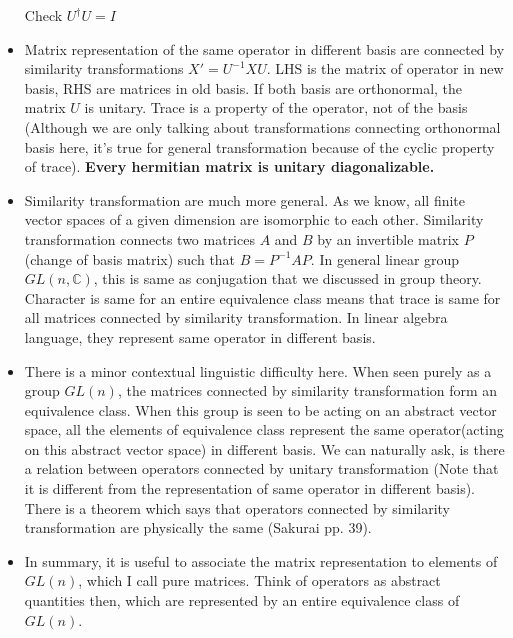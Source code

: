 \documentclass{report}
\begin{document}
\begin{itemize}
  Check $U^\dag U = I$

\item Matrix representation of the same operator in different basis are connected by similarity transformations $X' =U^{-1}XU$. LHS is the matrix of operator in new basis, RHS are matrices in old basis. If both basis are orthonormal, the matrix $U$ is unitary. Trace is a property of the operator, not of the basis (Although we are only talking about transformations connecting orthonormal basis here, it's true for general transformation because of the cyclic property of trace). \textbf{Every hermitian matrix is unitary diagonalizable.}\\

\item Similarity transformation are much more general. As we know, all finite vector spaces of a given dimension are isomorphic to each other. Similarity transformation connects two matrices $A$ and $B$ by an invertible matrix $P$(change of basis matrix) such that $B = P^{-1}AP$. In general linear group $GL(n,\mathbb{C})$, this is same as conjugation that we discussed in group theory. Character is same for an entire equivalence class means that trace is same for all matrices connected by similarity transformation. In linear algebra language, they represent same operator in different basis.\\

\item There is a minor contextual linguistic difficulty here. When seen purely as a group $GL(n)$, the matrices connected by similarity transformation form an equivalence class. When this group is seen to be acting on an abstract vector space, all the elements of equivalence class represent the same operator(acting on this abstract vector space) in different basis. We can naturally ask, is there a relation between operators connected by unitary transformation (Note that it is different from the representation of same operator in different basis). There is a theorem which says that operators connected by similarity transformation are physically the same (Sakurai pp. 39).\\

\item In summary, it is useful to associate the matrix representation to elements of $GL(n)$, which I call pure matrices. Think of operators as abstract quantities then, which are represented by an entire equivalence class of $GL(n)$.


\end{itemize}
\end{document}

